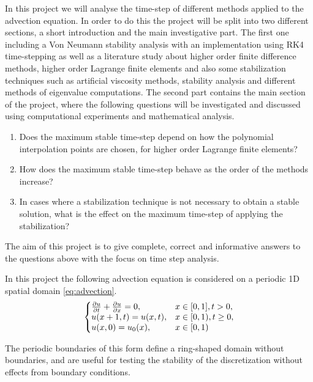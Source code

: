\documentclass[a4paper,10pt,twoside]{article}
\begin{document}
In this project we will analyse the time-step of different methods applied to the advection equation. In order to do this the project will be split into two different sections, a short introduction and the main investigative part. The first one including a Von Neumann stability analysis with an implementation using RK4 time-stepping as well as a literature study about higher order finite difference methods, higher order Lagrange finite elements and also some stabilization techniques  such  as  artificial viscosity methods, stability analysis and different methods of eigenvalue computations. 
The second part contains the main section of the project, where the following questions will be investigated and discussed using computational experiments and mathematical analysis.


\begin{enumerate}
    \item Does the maximum stable time-step depend on how the polynomial interpolation points are chosen, for higher order Lagrange finite elements?
    \item How does the maximum stable time-step behave as the order of the methods increase?
    \item In cases where a stabilization technique is not necessary to obtain a stable solution,  what is the effect on the maximum time-step of applying the stabilization?
\end{enumerate}

The aim of this project is to give complete, correct and informative answers to the questions above with the focus on time step analysis.

In this project the following advection equation is considered on a periodic 1D spatial domain \ref{eq:advection}.
\begin{equation}
  \left\{
  \begin{array}{@{}ll@{}}
    \frac{\partial u }{\partial t} + \frac{\partial u}{\partial x}= 0, & x \in [0,1], t>0,\\
    u(x+1, t) = u(x, t), & x \in [0,1), t \geq 0,\\
    u(x,0) = u_0(x), & x \in [0,1)
  \end{array}\right.
  \label{eq:advection}
\end{equation} 

The periodic boundaries of this form define a
ring-shaped domain without boundaries, and are useful
for testing the stability of the discretization without
effects from boundary conditions.
\end{document}
